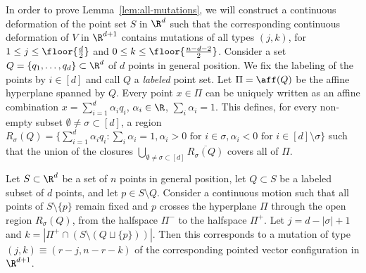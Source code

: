 In order to prove Lemma~\ref{lem:all-mutations}, we will construct a continuous deformation of the point set $S$ in $\R^d$ such that the corresponding continuous deformation of $V$ in $\R^{d+1}$ contains mutations of all types $(j,k)$, for  $1 \leq j \leq \floor{\frac{d}{2}}$ and $0 \leq k \leq \floor{\frac{n-d-2}{2}}$. 
%
Consider a set $Q=\{q_1,\dots,q_d\}\subset \R^d$ of $d$ points in general position. We fix the labeling of the points by $i\in [d]$ and call $Q$ a \emph{labeled} point set.
Let $\Pi=\aff(Q)$ be the affine hyperplane spanned by $Q$. Every point $x\in \Pi$ can be uniquely written as an affine combination $x=\sum_{i=1}^d \alpha_i q_i$, $\alpha_i \in \R$, $\sum_i \alpha_i =1$. This defines, for every non-empty subset 
$\emptyset \neq \sigma \subset [d]$, a region  $R_\sigma(Q)=\{\sum_{i=1}^d \alpha_i q_i \colon \sum_i \alpha_i =1, \alpha_i >0 \textrm{ for } i\in \sigma, \alpha_i<0 \textrm{ for } i\in [d]\setminus \sigma\}$ such that the union of the closures 
$\bigcup_{\emptyset \neq \sigma \subset [d]} \overline{R_\sigma(Q)}$ covers all of $\Pi$.
%
\begin{observation}
\label{obs:point-mutation}
Let $S \subset \R^d$ be a set of $n$ points in general position, let $Q\subset S$ be a labeled subset of $d$ points, and let $p\in S\setminus Q$. Consider a continuous motion such that all points of $S\setminus \{p\}$ remain fixed and $p$ crosses the hyperplane $\Pi$ through the open region $R_{\sigma}(Q)$, from the halfspace $\Pi^-$ to the halfspace $\Pi^+$. Let $j=d-|\sigma|+1$ and $k=|\Pi^+ \cap (S\setminus (Q \sqcup \{p\}))|$. Then this corresponds to a mutation of type $(j,k)\equiv (r-j,n-r-k)$ of the corresponding pointed vector  configuration in $\R^{d+1}$.
\end{observation}
%

